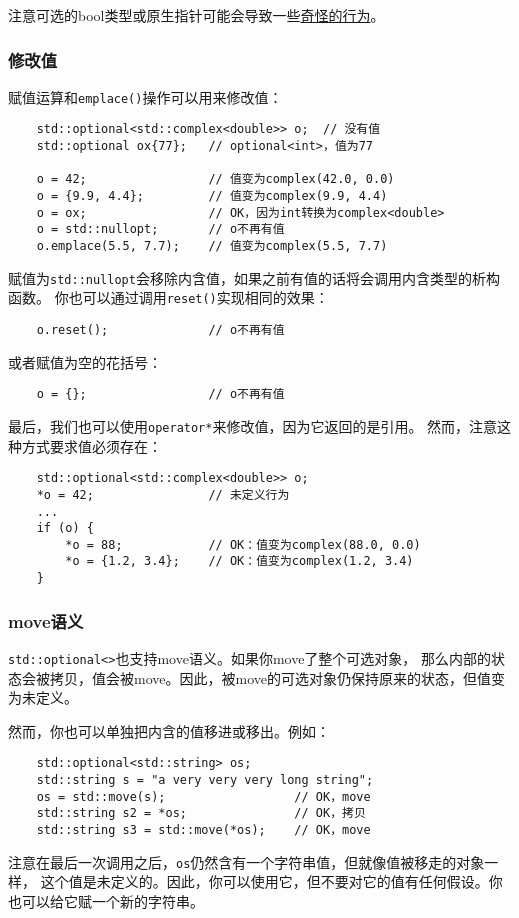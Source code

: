注意可选的bool类型或原生指针可能会导致一些\hyperref[ch15.3.1]{奇怪的行为}。

\subsubsection{修改值}
赋值运算和\texttt{emplace()}操作可以用来修改值：
\begin{lstlisting}
    std::optional<std::complex<double>> o;  // 没有值
    std::optional ox{77};   // optional<int>，值为77

    o = 42;                 // 值变为complex(42.0, 0.0)
    o = {9.9, 4.4};         // 值变为complex(9.9, 4.4)
    o = ox;                 // OK，因为int转换为complex<double>
    o = std::nullopt;       // o不再有值
    o.emplace(5.5, 7.7);    // 值变为complex(5.5, 7.7)
\end{lstlisting}
赋值为\texttt{std::nullopt}会移除内含值，如果之前有值的话将会调用内含类型的析构函数。
你也可以通过调用\texttt{reset()}实现相同的效果：
\begin{lstlisting}
    o.reset();              // o不再有值
\end{lstlisting}
或者赋值为空的花括号：
\begin{lstlisting}
    o = {};                 // o不再有值
\end{lstlisting}
最后，我们也可以使用\texttt{operator*}来修改值，因为它返回的是引用。
然而，注意这种方式要求值必须存在：
\begin{lstlisting}
    std::optional<std::complex<double>> o;
    *o = 42;                // 未定义行为
    ...
    if (o) {
        *o = 88;            // OK：值变为complex(88.0, 0.0)
        *o = {1.2, 3.4};    // OK：值变为complex(1.2, 3.4)
    }
\end{lstlisting}

\subsubsection{move语义}
\texttt{std::optional<>}也支持move语义。如果你move了整个可选对象，
那么内部的状态会被拷贝，值会被move。因此，被move的可选对象仍保持原来的状态，但值变为未定义。

然而，你也可以单独把内含的值移进或移出。例如：
\begin{lstlisting}
    std::optional<std::string> os;
    std::string s = "a very very very long string";
    os = std::move(s);                  // OK，move
    std::string s2 = *os;               // OK，拷贝
    std::string s3 = std::move(*os);    // OK，move
\end{lstlisting}
注意在最后一次调用之后，\texttt{os}仍然含有一个字符串值，但就像值被移走的对象一样，
这个值是未定义的。因此，你可以使用它，但不要对它的值有任何假设。你也可以给它赋一个新的字符串。

